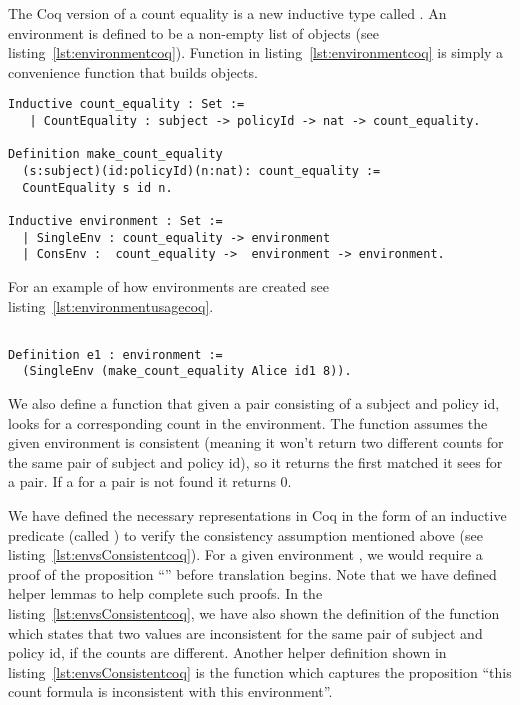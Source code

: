 The Coq version of a count equality is a new inductive type called . An environment is defined to be a non-empty list of  objects (see listing~\ref{lst:environmentcoq}). Function  in listing~\ref{lst:environmentcoq} is simply a convenience function that builds  objects. 

\begin{minipage}[c]{0.95\textwidth}
\begin{lstlisting}
Inductive count_equality : Set := 
   | CountEquality : subject -> policyId -> nat -> count_equality.

Definition make_count_equality
  (s:subject)(id:policyId)(n:nat): count_equality :=
  CountEquality s id n.
  
Inductive environment : Set := 
  | SingleEnv : count_equality -> environment
  | ConsEnv :  count_equality ->  environment -> environment.

\end{lstlisting}
\end{minipage}

For an example of how environments are created see listing~\ref{lst:environmentusagecoq}.

\begin{lstlisting}

Definition e1 : environment := 
  (SingleEnv (make_count_equality Alice id1 8)).

\end{lstlisting}
  

We also define a  function that given a pair consisting of a subject and policy id, looks for a corresponding count in the environment. The  function assumes the given environment is consistent (meaning it won't return two different counts for the same pair of subject and policy id), so it returns the first matched  it sees for a  pair. If a  for a  pair is not found it returns 0. 

We have defined the necessary representations in Coq in the form of an inductive predicate (called ) to verify the consistency assumption mentioned above (see listing~\ref{lst:envsConsistentcoq}). For a given environment , we would require a proof of the proposition ``'' before translation begins. Note that we have defined helper lemmas to help complete such proofs. In the listing~\ref{lst:envsConsistentcoq}, we have also shown the definition of the function  which states that two  values are inconsistent for the same pair of subject and policy id, if the counts are different. Another helper definition shown in listing~\ref{lst:envsConsistentcoq} is the function  which captures the proposition ``this count formula is inconsistent with this environment''.

